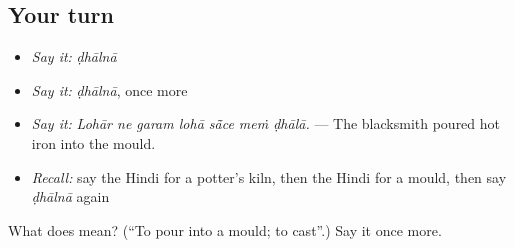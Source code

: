 \subsection*{Your turn}
\begin{itemize}
\raggedright
  \item \emph{Say it:} \emph{ḍhālnā}
  \item \emph{Say it:} \emph{ḍhālnā}, once more
  \item \emph{Say it:} \emph{Lohār ne garam lohā sā̃ce meṁ ḍhālā.} — The blacksmith poured hot iron into the mould.
  \item \emph{Recall:} say the Hindi for a potter's kiln, then the Hindi for a mould, then say \emph{ḍhālnā} again
\end{itemize}

\begin{tcolorbox}[breakable,colback=teal!4,colframe=teal!35!black,title={Before you move on}]
What does  mean? (\textquotedblleft{}To pour into a mould; to cast\textquotedblright{}.) Say it once more.
\end{tcolorbox}
